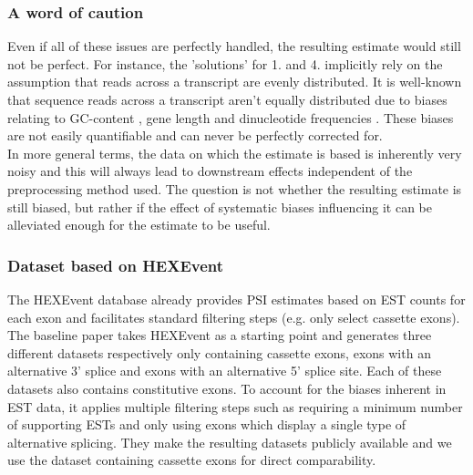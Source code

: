 \subsubsection{A word of caution} \label{subsubsec:caution}
Even if all of these issues are perfectly handled, the resulting estimate would still not be perfect. For instance, the 'solutions' for 1. and 4. implicitly rely on the assumption that reads across a transcript are evenly distributed. It is well-known that sequence reads across a transcript aren't equally distributed due to biases relating to GC-content \cite{gccontentbias}, gene length and dinucleotide frequencies \cite{rnaseqbiascorrection}.
These biases are not easily quantifiable and can never be perfectly corrected for.\\
In more general terms, the data on which the estimate is based is inherently very noisy and this will always lead to downstream effects independent of the preprocessing method used. The question is not whether the resulting estimate is still biased, but rather if the effect of systematic biases influencing it can be alleviated enough for the estimate to be useful. 
\subsubsection{Dataset based on HEXEvent}
The HEXEvent database already provides PSI estimates based on EST counts for each exon and facilitates standard filtering steps (e.g. only select cassette exons). 
The baseline paper \cite{dsc} takes HEXEvent as a starting point and generates three different datasets respectively only containing cassette exons, exons with an alternative 3' splice and exons with an alternative 5' splice site. Each of these datasets also contains constitutive exons. To account for the biases inherent in EST data, it applies multiple filtering steps such as requiring a minimum number of supporting ESTs and only using exons which display a single type of alternative splicing. They make the resulting datasets publicly available and we use the dataset containing cassette exons for direct comparability. 

